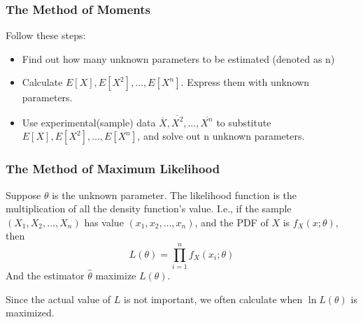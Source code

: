\documentclass{beamer}
\begin{document}
\begin{frame}
    \frametitle{The Method of Moments}
    Follow these steps:
    \begin{itemize}
        \item Find out how many unknown parameters to be estimated  (denoted as n)
        \item Calculate $E[X], E[X^2], \dots , E[X^n]$. Express them with unknown parameters.
        \item Use experimental(sample) data $\overline{X}, \overline{X^2}, \dots , \overline{X^n}$ to substitute $E[X], E[X^2], \dots , E[X^n]$, and solve out n unknown parameters.
    \end{itemize}
    

\end{frame}

\begin{frame}
    \frametitle{The Method of Maximum Likelihood}
    Suppose $\theta$ is the unknown parameter. The likelihood function is the multiplication of all the density function's value. I.e., if the sample $(X_1,X_2, \dots , X_n)$ has value $(x_1,x_2,\dots , x_n)$, and the PDF of $X$ is $f_X(x;\theta)$, then 
    \[L(\theta)=\prod\limits_{i=1}^{n}f_X(x_i;\theta)\]
    And the estimator $\hat{\theta}$ maximize $L(\theta)$.\par
    Since the actual value of $L$ is not important, we often calculate when $\ln L(\theta)$ is maximized.
    

\end{frame}
\end{document}
